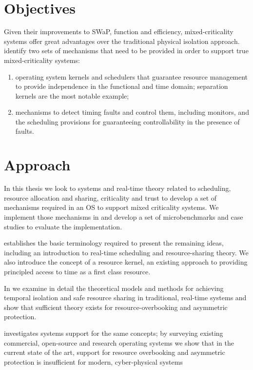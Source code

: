 \section{Objectives}

Given their improvements to \gls{SWaP}, function and efficiency, mixed-criticality systems offer
great advantages over the traditional physical isolation approach. 
\citet{Ernst_DiNatale_16} identify two sets of mechanisms that need to be provided in order to
support true mixed-criticality systems:

\begin{enumerate}
    \item operating system kernels and schedulers that guarantee resource
        management to provide independence in the
        functional and time domain; separation kernels
        are the most notable example;
    \item mechanisms to detect timing faults and control
        them, including monitors, and the scheduling
        provisions for guaranteeing controllability in the
        presence of faults.
\end{enumerate}


\section{Approach}

In this thesis we look to systems and real-time theory related to scheduling, resource allocation
and sharing, criticality and trust to develop a set of mechanisms required in an \gls{OS} to 
support mixed criticality systems. We implement those mechanisms in \selfour and develop a set of
microbenchmarks and case studies to evaluate the implementation. 

 establishes the basic terminology required to present
the remaining ideas, including an introduction to real-time scheduling and resource-sharing theory.
We also introduce the concept of a resource kernel, an existing approach to providing principled
access to time as a first class resource.

In  we examine in detail the theoretical models and methods for achieving temporal
isolation and safe resource sharing in traditional, real-time systems and show that sufficient
theory exists for resource-overbooking and asymmetric protection.

investigates systems support for the same concepts; by surveying existing commercial, open-source
and research operating systems we show that in the current state of the art, support for resource
overbooking and asymmetric protection is insufficient for modern, cyber-physical systems

